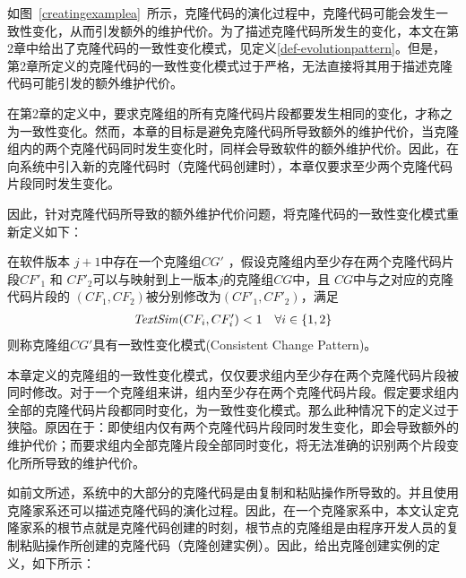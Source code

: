如图~\ref{creatingexamplea}~所示，克隆代码的演化过程中，克隆代码可能会发生一致性变化，从而引发额外的维护代价。为了描述克隆代码所发生的变化，本文在第2章中给出了克隆代码的一致性变化模式，见定义\ref{def-evolutionpattern}。但是，
第2章所定义的克隆代码的一致性变化模式过于严格，无法直接将其用于描述克隆代码可能引发的额外维护代价。

在第2章的定义中，要求克隆组的所有克隆代码片段都要发生相同的变化，才称之为一致性变化。然而，本章的目标是避免克隆代码所导致额外的维护代价，当克隆组内的两个克隆代码同时发生变化时，同样会导致软件的额外维护代价。因此，在向系统中引入新的克隆代码时（克隆代码创建时），本章仅要求至少两个克隆代码片段同时发生变化。

因此，针对克隆代码所导致的额外维护代价问题，将克隆代码的一致性变化模式重新定义如下：

\begin{definition}[克隆创建时一致性变化模式] 
\label{def-creatingpattern}
在软件版本 $j+1$中存在一个克隆组$CG'$ ，假设克隆组内至少存在两个克隆代码片段$CF'_1$ 和 $CF'_2$可以与映射到上一版本$j$的克隆组$CG$中，且 $CG$中与之对应的克隆代码片段的 $(CF_1,CF_2)$被分别修改为$(CF'_1,CF'_2)$，满足
  \[
  \begin{array}[t]{cr}
    \mathit{TextSim}(CF_i, CF'_i) < 1 & \forall i \in \{1,2\}  \\
  \end{array}
  \]
则称克隆组$CG'$具有一致性变化模式(Consistent Change Pattern)。
\end{definition}


本章定义的克隆组的一致性变化模式，仅仅要求组内至少存在两个克隆代码片段被同时修改。对于一个克隆组来讲，组内至少存在两个克隆代码片段。假定要求组内全部的克隆代码片段都同时变化，为一致性变化模式。那么此种情况下的定义过于狭隘。原因在于：即使组内仅有两个克隆代码片段同时发生变化，即会导致额外的维护代价；而要求组内全部克隆片段全部同时变化，将无法准确的识别两个片段变化所所导致的维护代价。

如前文所述，系统中的大部分的克隆代码是由复制和粘贴操作所导致的。并且使用克隆家系还可以描述克隆代码的演化过程。因此，在一个克隆家系中，本文认定克隆家系的根节点就是克隆代码创建的时刻，根节点的克隆组是由程序开发人员的复制粘贴操作所创建的克隆代码（克隆创建实例）。因此，给出克隆创建实例的定义，如下所示：

